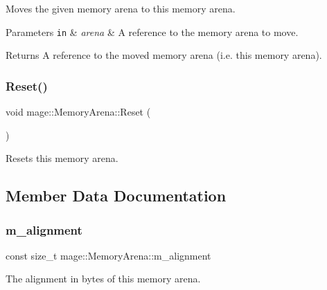Moves the given memory arena to this memory arena.


\begin{DoxyParams}[1]{Parameters}
\mbox{\tt in}  & {\em arena} & A reference to the memory arena to move. \\
\hline
\end{DoxyParams}
\begin{DoxyReturn}{Returns}
A reference to the moved memory arena (i.\+e. this memory arena). 
\end{DoxyReturn}
\hypertarget{classmage_1_1_memory_arena_a117b74c7bd5dfb28dfdaae6cab253491}{}\label{classmage_1_1_memory_arena_a117b74c7bd5dfb28dfdaae6cab253491} 
\subsubsection{\texorpdfstring{Reset()}{Reset()}}
{\footnotesize\ttfamily void mage\+::\+Memory\+Arena\+::\+Reset (\begin{DoxyParamCaption}{ }\end{DoxyParamCaption})}

Resets this memory arena. 

\subsection{Member Data Documentation}
\hypertarget{classmage_1_1_memory_arena_a424c3ff6f1d96545dd08f94c1c79c963}{}\label{classmage_1_1_memory_arena_a424c3ff6f1d96545dd08f94c1c79c963} 
\subsubsection{\texorpdfstring{m\+\_\+alignment}{m\_alignment}}
{\footnotesize\ttfamily const size\+\_\+t mage\+::\+Memory\+Arena\+::m\+\_\+alignment\hspace{0.3cm}{\ttfamily [private]}}

The alignment in bytes of this memory arena. \hypertarget{classmage_1_1_memory_arena_a02f251a5aafa61d239b4daed3458a654}{}\label{classmage_1_1_memory_arena_a02f251a5aafa61d239b4daed3458a654} 
